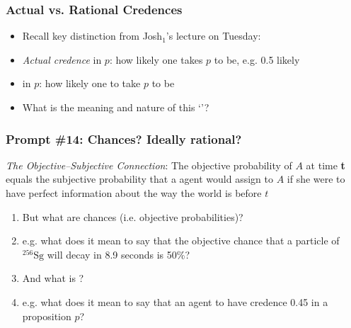 \begin{frame}
\frametitle{Actual vs. Rational Credences}

\begin{itemize}[<+->]

\item Recall key distinction from Josh$_1$'s lecture on Tuesday:

\item \emph{Actual credence} in $p$: how likely one takes $p$ to be, e.g. 0.5 likely

\item {} in $p$: how likely one  to take $p$ to be

\item What is the meaning and nature of this `'? 




\end{itemize}
\end{frame}

\begin{frame}
\frametitle{Prompt \#14: Chances? Ideally rational?}

\emph{The Objective--Subjective Connection}: The objective probability of $A$ at time \textbf{t} equals the subjective probability that a  agent would assign to $A$ if she were to have perfect information about the way the world is before $t$ 

\begin{enumerate}[<+->]

\item But what are chances (i.e. objective probabilities)?

\item[] e.g. what does it mean to say that the objective chance that a particle of $^{256}\mbox{Sg}$ will decay in 8.9 seconds is 50\%? 

\item And what is ? 
\item[] e.g. what does it mean to say that an agent  to have credence 0.45 in a proposition $p$? 

\end{enumerate}
\end{frame}

